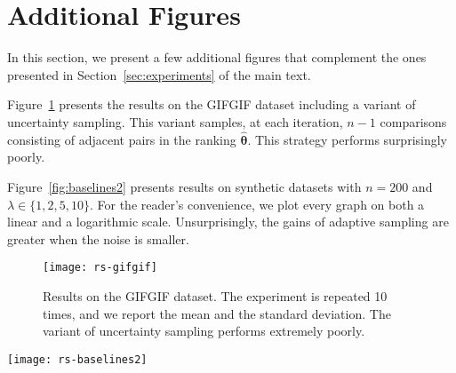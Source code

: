 \section{Additional Figures}  %
\label{app:figures}

In this section, we present a few additional figures that complement the ones presented in Section~\ref{sec:experiments} of the main text.

Figure~\ref{fig:gifgif} presents the results on the GIFGIF dataset including a variant of uncertainty sampling.
This variant samples, at each iteration, $n-1$ comparisons consisting of adjacent pairs in the ranking $\hat{\bm{\theta}}$.
This strategy performs surprisingly poorly.

Figure~\ref{fig:baselines2} presents results on synthetic datasets with $n = 200$ and $\lambda \in \{ 1, 2, 5, 10 \}$.
For the reader's convenience, we plot every graph on both a linear and a logarithmic scale.
Unsurprisingly, the gains of adaptive sampling are greater when the noise is smaller.

\begin{figure}[t]
\centering
\texttt{[image: rs-gifgif]}
\caption{
Results on the GIFGIF dataset.
The experiment is repeated \num{10} times, and we report the mean and the standard deviation.
The variant of uncertainty sampling performs extremely poorly.
}
\label{fig:gifgif}
\end{figure}


\begin{figure*}[t]
\centering
\texttt{[image: rs-baselines2]}
\caption{
Results on synthetic datasets for $n = 200$ and increasing values of $\lambda$.
Every experiment is repeated \num{10} times, and we report the mean and the standard deviation.
}
\label{fig:baselines2}
\end{figure*}
